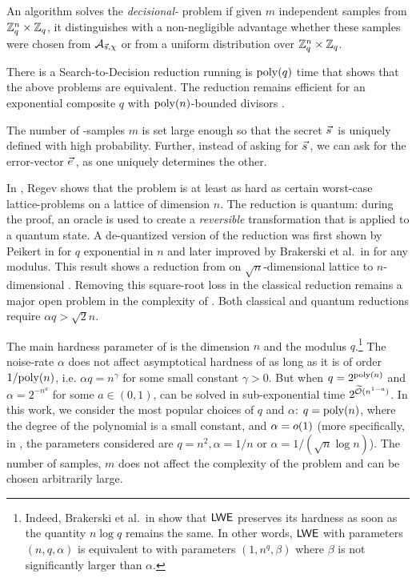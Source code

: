 \begin{definition} \label{def:decLWE}
	An algorithm solves the \emph{decisional-\LWE} problem if given $m$ independent samples from ${{\mathbb Z}}_q^n \times {{\mathbb Z}}_q$, it distinguishes with a non-negligible advantage whether these samples were chosen from $\mathcal{A}_{\vec s, \chi}$ or from a uniform distribution over ${{\mathbb Z}}_q^n \times {{\mathbb Z}}_q$.
\end{definition}

There is a Search-to-Decision reduction \cite{C:MicMol11, STOC:Regev05} running is $\mathrm{poly}(q)$ time that shows that the above problems are equivalent. The reduction remains efficient for an exponential composite $q$ with $\mathrm{poly}(n)$-bounded divisors \cite{EC:MicPei12}.  

The number of \LWE-samples $m$ is set large enough so that the secret $\svec$ is uniquely defined with high probability. Further, instead of asking for $\svec$, we can ask for the error-vector $\evec$, as one uniquely determines the other.

In \cite{STOC:Regev05}, Regev shows that the \LWE problem is at least as hard as certain worst-case lattice-problems on a lattice of dimension $n$. The reduction is quantum: during the proof, an \LWE oracle is used to create a \emph{reversible} transformation that is applied to a quantum state. A de-quantized version of the reduction was first shown by Peikert in \cite{STOC:Peikert09} for $q$ exponential in $n$ and later improved by Brakerski et al.\ in \cite{STOC:BLPRS13} for any modulus. This result shows a reduction from \appSVP on $\sqrt{n}$-dimensional lattice to $n$-dimensional \LWE. Removing this square-root loss in the classical reduction remains a major open problem in the complexity of \LWE. Both classical and quantum reductions require $\alpha q > \sqrt{2}n$. 

The main hardness parameter of \LWE is the dimension $n$ and the modulus $q$.\footnote{Indeed, Brakerski et al.\ in \cite{STOC:BLPRS13} show that $\textsf{LWE}$ preserves its hardness as soon as the quantity $n \log q$ remains the same. In other words, $\textsf{LWE}$ with parameters $(n,q,\alpha)$ is equivalent to \LWE with parameters $(1, n^q, \beta)$ where $\beta$ is not significantly larger than $\alpha$.} The noise-rate $\alpha$ does not affect asymptotical hardness of \LWE as long as it is of order $1/\mathrm{poly}(n)$, i.e. $\alpha q = n^{\gamma}$ for some small constant $\gamma>0$. But when $q=2^{\mathrm{poly}(n)}$ and $\alpha=2^{-n^a}$ for some $a \in (0,1)$, \LWE can be solved in sub-exponential time $2^{\widetilde{\mathcal{O}}(n^{1-a})}$. In this work, we consider the most popular choices of $q$ and $\alpha$: $q = \mathrm{poly}(n)$, where the degree of the polynomial is a small constant, and $\alpha = o(1)$ (more specifically, in \cite{STOC:Regev05}, the parameters considered are $q = n^2, \alpha = 1/n$ or $\alpha = 1/(\sqrt{n} \log n)$). The number of samples, $m$ does not affect the complexity of the problem and can be chosen arbitrarily large. 

